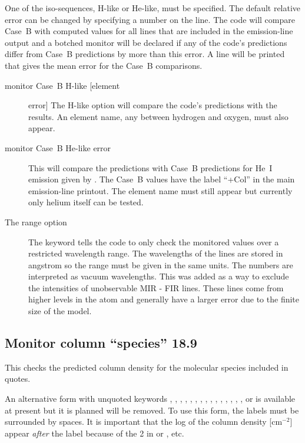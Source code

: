 One of the iso-sequences, H-like or He-like, must be specified.
The default
relative error can be changed by specifying a number on the line.
The code
will compare Case~B with computed values for all lines that are included
in the emission-line output
and a botched monitor will be declared if any
of the code's predictions differ from Case~B predictions by more than this
error.
A line will be printed that gives the mean error for the Case~B
comparisons.
\begin{description}
\item[monitor Case~B H-like [element] error]  The H-like option will compare
the code's predictions with the \citet{Storey1995} results.  An element
name, any between hydrogen and oxygen, must also appear.

\item[monitor Case~B He-like error]  This will compare the predictions with Case~B predictions for He~I emission given by 
\citet{Porter.R12Improved-He-I-emissivities-in-the-case-B-approximation, Porter.R13-CaseB-erratum}.  
The Case~B values have the label ``+Col'' in the main emission-line printout. The
element name must still appear but currently only helium itself can be
tested.

\item[The range option]  The keyword 
tells the code to only check the
monitored values over a restricted wavelength range.
The wavelengths of
the lines are stored in angstrom so the range must be given in
the same units. The numbers are interpreted as vacuum wavelengths.
This was added as a way to exclude the intensities of
unobservable MIR - FIR lines.  These lines come from higher levels in the
atom and generally have a larger error due to the finite size of the model.
\end{description}

\subsection{Monitor column ``species'' 18.9}

This checks the predicted column density for the molecular species
included in quotes.

An alternative form with unquoted keywords ,
, , , ,
, , , ,
, , , ,
, , or  is available at
present but it is planned will be removed.  To use this form, the
labels must be surrounded by spaces.  It is important that the log of
the column density [cm$^{-2}$] appear \emph{after} the label because
of the 2 in  or , etc.

